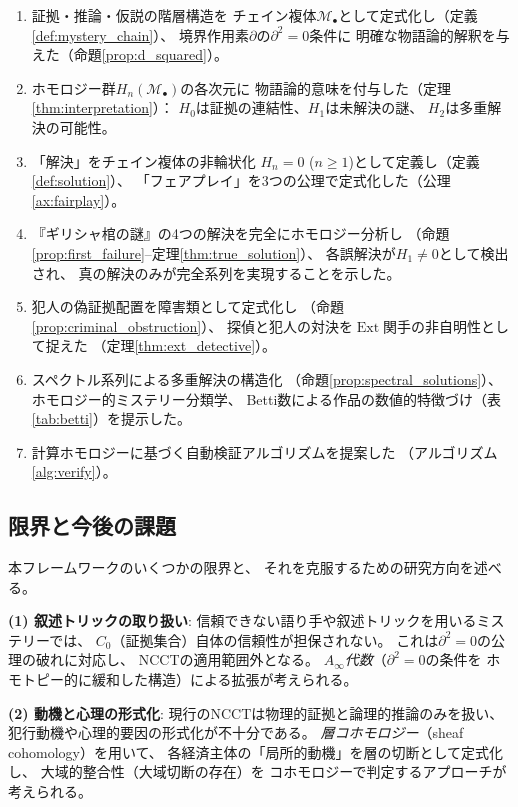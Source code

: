 \documentclass[12pt,twocolumn]{ltjsarticle}
\newcommand{\Ext}{\operatorname{Ext}}
\newcommand{\Mys}{\mathcal{M}}
\begin{document}
\begin{enumerate}
\item 証拠・推論・仮説の階層構造を
チェイン複体$\Mys_\bullet$として定式化し（定義\ref{def:mystery_chain}）、
境界作用素$\partial$の$\partial^2 = 0$条件に
明確な物語論的解釈を与えた（命題\ref{prop:d_squared}）。

\item ホモロジー群$H_n(\Mys_\bullet)$の各次元に
物語論的意味を付与した（定理\ref{thm:interpretation}）：
$H_0$は証拠の連結性、$H_1$は未解決の謎、
$H_2$は多重解決の可能性。

\item 「解決」をチェイン複体の非輪状化
$H_n = 0$ ($n \geq 1$)として定義し（定義\ref{def:solution}）、
「フェアプレイ」を3つの公理で定式化した（公理\ref{ax:fairplay}）。

\item 『ギリシャ棺の謎』の4つの解決を完全にホモロジー分析し
（命題\ref{prop:first_failure}--定理\ref{thm:true_solution}）、
各誤解決が$H_1 \neq 0$として検出され、
真の解決のみが完全系列を実現することを示した。

\item 犯人の偽証拠配置を障害類として定式化し
（命題\ref{prop:criminal_obstruction}）、
探偵と犯人の対決を$\Ext$関手の非自明性として捉えた
（定理\ref{thm:ext_detective}）。

\item スペクトル系列による多重解決の構造化
（命題\ref{prop:spectral_solutions}）、
ホモロジー的ミステリー分類学、
Betti数による作品の数値的特徴づけ（表\ref{tab:betti}）を提示した。

\item 計算ホモロジーに基づく自動検証アルゴリズムを提案した
（アルゴリズム\ref{alg:verify}）。
\end{enumerate}

\subsection{限界と今後の課題}

本フレームワークのいくつかの限界と、
それを克服するための研究方向を述べる。

\textbf{(1) 叙述トリックの取り扱い}:
信頼できない語り手や叙述トリックを用いるミステリーでは、
$C_0$（証拠集合）自体の信頼性が担保されない。
これは$\partial^2 = 0$の公理の破れに対応し、
NCCTの適用範囲外となる。
\emph{$A_\infty$代数}（$\partial^2 = 0$の条件を
ホモトピー的に緩和した構造）による拡張が考えられる。

\textbf{(2) 動機と心理の形式化}:
現行のNCCTは物理的証拠と論理的推論のみを扱い、
犯行動機や心理的要因の形式化が不十分である。
\emph{層コホモロジー}（sheaf cohomology）を用いて、
各経済主体の「局所的動機」を層の切断として定式化し、
大域的整合性（大域切断の存在）を
コホモロジーで判定するアプローチが考えられる。
\end{document}

